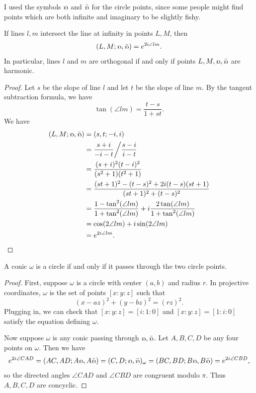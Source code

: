 I used the symbols $\fish$ and $\bar\fish$ for the circle points, since some people might find points which are both infinite and imaginary to be slightly fishy.

\begin{thm} If lines $l, m$ intersect the line at infinity in points $L,M$, then
\[
(L,M;\fish,\bar\fish) = e^{2i\angle lm}.
\]
In particular, lines $l$ and $m$ are orthogonal if and only if points $L,M,\fish,\bar\fish$ are harmonic.
\end{thm}
\begin{proof} Let $s$ be the slope of line $l$ and let $t$ be the slope of line $m$. By the tangent subtraction formula, we have
\[
\tan(\angle lm) = \frac{t-s}{1+st}.
\]
We have
\begin{align*}
(L,M;\fish,\bar\fish) &= (s,t;-i,i)\\
&= \frac{s+i}{-i-t}\bigg/\frac{s-i}{i-t}\\
&= \frac{(s+i)^2(t-i)^2}{(s^2+1)(t^2+1)}\\
&= \frac{(st+1)^2 - (t-s)^2 + 2i(t-s)(st+1)}{(st+1)^2 + (t-s)^2}\\
&= \frac{1-\tan^2(\angle lm)}{1+\tan^2(\angle lm)} + i\frac{2\tan(\angle lm)}{1+\tan^2(\angle lm)}\\
&= \cos(2\angle lm) + i\sin(2\angle lm)\\
&= e^{2i\angle lm}.\qedhere
\end{align*}
\end{proof}

\begin{thm} A conic $\omega$ is a circle if and only if it passes through the two circle points.
\end{thm}
\begin{proof} First, suppose $\omega$ is a circle with center $(a,b)$ and radius $r$. In projective coordinates, $\omega$ is the set of points $[x:y:z]$ such that
\[
(x-az)^2 + (y-bz)^2 = (rz)^2.
\]
Plugging in, we can check that $[x:y:z] = [i:1:0]$ and $[x:y:z] = [1:i:0]$ satisfy the equation defining $\omega$.

Now suppose $\omega$ is any conic passing through $\fish,\bar\fish$. Let $A,B,C,D$ be any four points on $\omega$. Then we have
\[
e^{2i\angle CAD} = (AC,AD;A\fish,A\bar\fish) = (C,D;\fish,\bar\fish)_{\omega} = (BC,BD;B\fish,B\bar\fish) = e^{2i\angle CBD},
\]
so the directed angles $\angle CAD$ and $\angle CBD$ are congruent modulo $\pi$. Thus $A,B,C,D$ are concyclic.
\end{proof}

